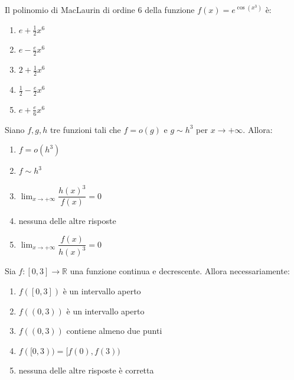 \begin{quiz}
Il polinomio di MacLaurin di ordine $6$ della funzione $f(x)=e^{\cos(x^3)}$ \`e:
\begin{enumerate}
\item $e+\frac12x^6$
\item $e-\frac e2x^6$
\item $2+\frac12x^6$
\item $\frac12-\frac e2x^6$
\item $e+\frac e6x^6$
\end{enumerate}
\end{quiz}

\begin{quiz}
Siano $f,g,h$ tre funzioni tali che $f=o(g)$ e $g\sim h^3$ per $x\to+\infty$. Allora:
\begin{enumerate}
\item $f=o(h^3)$
\item $f\sim h^3$
\item $\lim_{x\to+\infty}\dfrac{h(x)^3}{f(x)}=0$
\item nessuna delle altre risposte
\item $\lim_{x\to+\infty}\dfrac{f(x)}{h(x)^3}=0$
\end{enumerate}
\end{quiz}

\begin{quiz}
Sia $f:[0,3]\to\mathbb R$ una funzione continua e decrescente. Allora necessariamente:
\begin{enumerate}
\item $f([0,3])$ \`e un intervallo aperto
\item $f((0,3))$ \`e un intervallo aperto
\item $f((0,3))$ contiene almeno due punti
\item $f([0,3))=[f(0),f(3))$
\item nessuna delle altre risposte \`e corretta
\end{enumerate}
\end{quiz}

